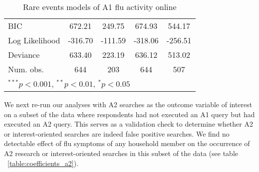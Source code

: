 \documentclass[12pt]{article}
\begin{document}
\begin{table}
\begin{center}
\begin{tabular}{l c c c c }
BIC            & 672.21         & 249.75         & 674.93         & 544.17         \\
Log Likelihood & -316.70        & -111.59        & -318.06        & -256.51        \\
Deviance       & 633.40         & 223.19         & 636.12         & 513.02         \\
Num. obs.      & 644            & 203            & 644            & 507            \\
\hline
\multicolumn{5}{l}{\scriptsize{$^{***}p<0.001$, $^{**}p<0.01$, $^*p<0.05$}}
\end{tabular}
\caption{Rare events models of A1 flu activity online}
\label{table:coefficients_a1}
\end{center}
\end{table}

\clearpage
\newpage

We next re-run our analyses with A2 searches as the outcome variable of interest on a subset of the data where respondents had not executed an A1 query but had executed an A2 query. This serves as a validation check to determine whether A2 or interest-oriented searches are indeed false positive searches. We find no detectable effect of flu symptoms of any household member on the occurrence of A2 research or interest-oriented searches in this subset of the data (see table ~\ref{table:coefficients_a2}).
\end{document}

